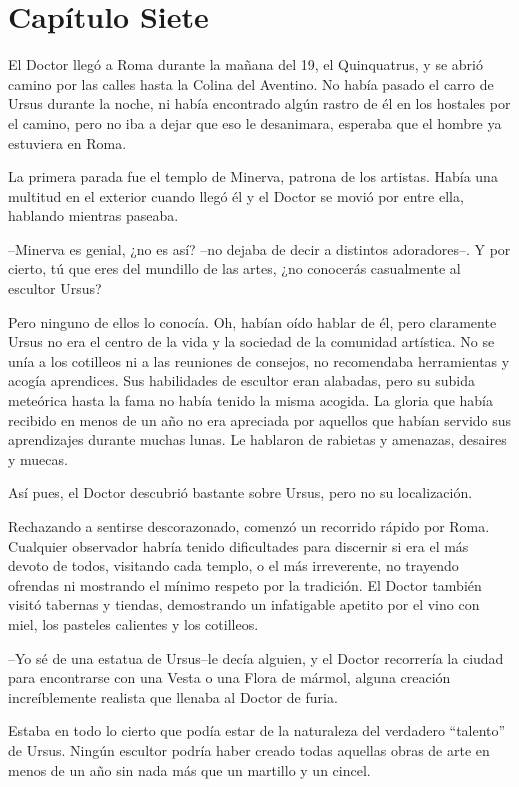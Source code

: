 \chapter*{Capítulo Siete}

El Doctor llegó a Roma durante la mañana del 19, el Quinquatrus, y se
abrió camino por las calles hasta la Colina del Aventino. No había
pasado el carro de Ursus durante la noche, ni había encontrado algún
rastro de él en los hostales por el camino, pero no iba a dejar que eso
le desanimara, esperaba que el hombre ya estuviera en Roma.

La primera parada fue el templo de Minerva, patrona de los artistas.
Había una multitud en el exterior cuando llegó él y el Doctor se movió
por entre ella, hablando mientras paseaba.

--Minerva es genial, ¿no es así? --no dejaba de decir a distintos
adoradores--. Y por cierto, tú que eres del mundillo de las artes, ¿no
conocerás casualmente al escultor Ursus?

Pero ninguno de ellos lo conocía. Oh, habían oído hablar de él, pero
claramente Ursus no era el centro de la vida y la sociedad de la
comunidad artística. No se unía a los cotilleos ni a las reuniones de
consejos, no recomendaba herramientas y acogía aprendices. Sus
habilidades de escultor eran alabadas, pero su subida meteórica hasta la
fama no había tenido la misma acogida. La gloria que había recibido en
menos de un año no era apreciada por aquellos que habían servido sus
aprendizajes durante muchas lunas. Le hablaron de rabietas y amenazas,
desaires y muecas.

Así pues, el Doctor descubrió bastante sobre Ursus, pero no su
localización.

Rechazando a sentirse descorazonado, comenzó un recorrido rápido por
Roma. Cualquier observador habría tenido dificultades para discernir si
era el más devoto de todos, visitando cada templo, o el más irreverente,
no trayendo ofrendas ni mostrando el mínimo respeto por la tradición. El
Doctor también visitó tabernas y tiendas, demostrando un infatigable
apetito por el vino con miel, los pasteles calientes y los cotilleos.

--Yo sé de una estatua de Ursus--le decía alguien, y el Doctor
recorrería la ciudad para encontrarse con una Vesta o una Flora de
mármol, alguna creación increíblemente realista que llenaba al Doctor de
furia.

Estaba en todo lo cierto que podía estar de la naturaleza del verdadero
``talento'' de Ursus. Ningún escultor podría haber creado todas aquellas
obras de arte en menos de un año sin nada más que un martillo y un
cincel.


